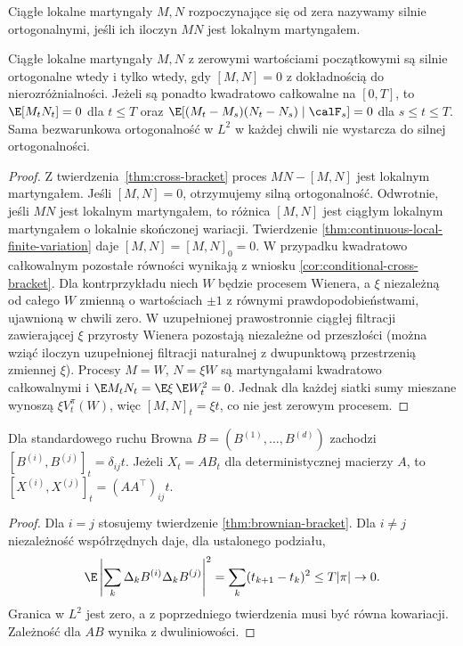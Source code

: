 \begin{definicja}
Ciągłe lokalne martyngały $M,N$ rozpoczynające
się od zera nazywamy silnie ortogonalnymi, jeśli
ich iloczyn $MN$ jest lokalnym martyngałem.
\end{definicja}

\begin{twierdzenie}
\label{thm:strong-orthogonality-bracket}
Ciągłe lokalne martyngały $M,N$ z zerowymi
wartościami początkowymi są silnie ortogonalne
wtedy i tylko wtedy, gdy $[M,N]=0$
z dokładnością do nierozróżnialności.
Jeżeli są ponadto kwadratowo całkowalne
na $[0,T]$, to
$\E[M_tN_t]=0$ dla $t\le T$ oraz
$\E[(M_t-M_s)(N_t-N_s)\mid\calF_s]=0$
dla $s\le t\le T$.
Sama bezwarunkowa ortogonalność w $L^2$
w każdej chwili nie wystarcza do silnej ortogonalności.
\end{twierdzenie}
\begin{proof}
Z twierdzenia~\ref{thm:cross-bracket} proces
$MN-[M,N]$ jest lokalnym martyngałem.
Jeśli $[M,N]=0$, otrzymujemy silną ortogonalność.
Odwrotnie, jeśli $MN$ jest lokalnym martyngałem,
to różnica $[M,N]$ jest ciągłym lokalnym martyngałem
o lokalnie skończonej wariacji. Twierdzenie
\ref{thm:continuous-local-finite-variation} daje
$[M,N]=[M,N]_0=0$.
W przypadku kwadratowo całkowalnym pozostałe
równości wynikają z wniosku
\ref{cor:conditional-cross-bracket}.
Dla kontrprzykładu niech $W$ będzie procesem
Wienera, a $\xi$ niezależną od całego $W$
zmienną o wartościach $\pm1$ z równymi
prawdopodobieństwami, ujawnioną w chwili zero.
W uzupełnionej prawostronnie ciągłej filtracji
zawierającej $\xi$ przyrosty Wienera pozostają
niezależne od przeszłości (można wziąć iloczyn
uzupełnionej filtracji naturalnej z dwupunktową
przestrzenią zmiennej $\xi$).
Procesy $M=W$, $N=\xi W$ są martyngałami
kwadratowo całkowalnymi i
$\E M_tN_t=\E\xi\,\E W_t^2=0$.
Jednak dla każdej siatki sumy mieszane wynoszą
$\xi V_t^\pi(W)$, więc $[M,N]_t=\xi t$,
co nie jest zerowym procesem.
\end{proof}

\begin{wniosek}
Dla standardowego ruchu Browna
$B=(B^{(1)},\ldots,B^{(d)})$ zachodzi
$[B^{(i)},B^{(j)}]_t=\delta_{ij}t$.
Jeżeli $X_t=AB_t$ dla deterministycznej macierzy $A$,
to $[X^{(i)},X^{(j)}]_t=(AA^\top)_{ij}t$.
\end{wniosek}
\begin{proof}
Dla $i=j$ stosujemy twierdzenie
\ref{thm:brownian-bracket}. Dla $i\ne j$ niezależność
współrzędnych daje, dla ustalonego podziału,
\[
\E\left|\sum_k\Delta_kB^{(i)}\Delta_kB^{(j)}\right|^2
=\sum_k (t_{k+1}-t_k)^2\le T|\pi|\to0.
\]
Granica w $L^2$ jest zero, a z poprzedniego
twierdzenia musi być równa kowariacji. Zależność
dla $AB$ wynika z dwuliniowości.
\end{proof}


